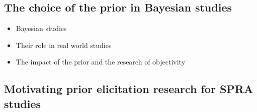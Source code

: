 \subsection{The choice of the prior in Bayesian studies}






\begin{itemize}
    \item Bayesian studies
    \item Their role in real world studies
    \item The impact of the prior and the research of objectivity
\end{itemize}

\subsection{Motivating prior elicitation research for SPRA studies}





